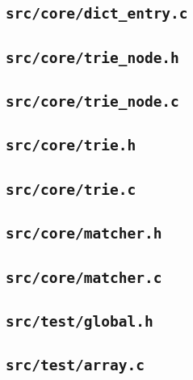 \documentclass[../main.tex]{subfiles}
\begin{document}
\subsection{\texttt{src/core/dict\_entry.c}}


\subsection{\texttt{src/core/trie\_node.h}}


\subsection{\texttt{src/core/trie\_node.c}}


\subsection{\texttt{src/core/trie.h}}


\subsection{\texttt{src/core/trie.c}}


\subsection{\texttt{src/core/matcher.h}}


\subsection{\texttt{src/core/matcher.c}}


\subsection{\texttt{src/test/global.h}}


\subsection{\texttt{src/test/array.c}}

\end{document}

